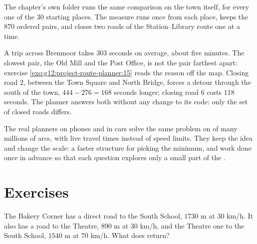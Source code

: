 \label{out:g12:project-route-planner:tests}

The chapter's own folder runs the same comparison on the town itself, for every one of the $30$ starting places. The
measure runs  once from each place, keeps the $870$ ordered pairs, and closes two roads of the
Station--Library route one at a time.

\label{lst:g12:project-route-planner:m5}

\label{out:g12:project-route-planner:m5}

A trip across Brenmoor takes $303$ seconds on average, about five minutes. The slowest pair, the Old Mill and the Post
Office, is not the pair farthest apart: exercise \ref{exo:g12:project-route-planner:15} reads the reason off the map.
Closing road $2$, between the Town Square and North Bridge, forces a detour through the south of the town,
$444 - 276 = 168$ seconds longer; closing road $6$ costs $118$ seconds. The planner answers both without any change to
its code: only the set of closed roads differs.

\begin{remark}
The real planners on phones and in cars solve the same problem on  of many millions of arcs, with live travel
times instead of speed limits. They keep the idea and change the scale: a faster structure for picking the minimum,
and work done once in advance so that each question explores only a small part of the .
\end{remark}

\section{Exercises}\label{sec:g12:project-route-planner:exercises}

\begin{exercise}[$\star$]\label{exo:g12:project-route-planner:1}
The Bakery Corner has a direct road to the South School, $1730$ m at $30$ km/h. It also has a road to the Theatre,
$890$ m at $30$ km/h, and the Theatre one to the South School, $1540$ m at $70$ km/h. What does
 return?
\end{exercise}

